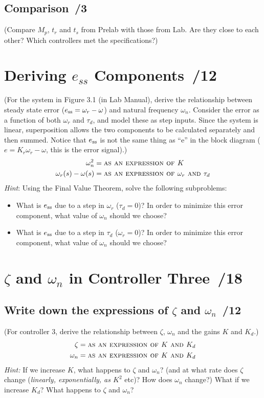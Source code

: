 \documentclass{article}
\newcommand{\score}{\hfill \underline{\hspace{0.65cm}}\,/} %
\begin{document}
\subsection{Comparison \score 3}
(Compare $M_p$, $t_r$ and $t_s$ from Prelab with those from Lab. Are they close to each other? Which controllers met the specifications?)

\section{{\sc Deriving $e_{ss}$ Components} \score 12}
(For the system in Figure 3.1 (in Lab Manual), derive the relationship between steady state error ($e_{\rm ss}= \omega_r - \omega$) and natural frequency $\omega_n$. Consider the error as a function of both $\omega_r$ and $\tau_d$, and model these as step inputs. Since the system is linear, superposition allows the two components to be calculated separately and then summed. Notice that $e_{\rm ss}$ is not the same thing as ``e'' in the block diagram ($e= K_r\omega_r - \omega$, this is the error signal).)
\begin{align*}
  \omega_n^2 & = \mbox{\sc as an expression of $K$} \\
  \omega_r(s) - \omega(s) & = \mbox{\sc as an expression of $\omega_r$ and $\tau_d$}
\end{align*}
\emph{Hint}: Using the Final Value Theorem, solve the following subproblems:
\begin{itemize}
\item What is $e_{\rm ss}$ due to a step in $\omega_r$ ($\tau_d = 0$)? In order to minimize this error component, what value of $\omega_n$ should we choose?
\item What is $e_{\rm ss}$ due to a step in $\tau_d$ ($\omega_r = 0$)? In order to minimize this error component, what value of $\omega_n$ should we choose?
\end{itemize}

\section{{\sc $\zeta$ and $\omega_n$ in Controller Three} \score 18}
\subsection{Write down the expressions of $\zeta$ and $\omega_n$ \score 12}
(For controller 3, derive the relationship between $\zeta$, $\omega_n$ and the gains $K$ and $K_d$.)
\begin{align*}
\zeta & = \mbox{\sc as an expression of $K$ and $K_d$} \\  
\omega_n & = \mbox{\sc as an expression of $K$ and $K_d$}  
\end{align*}
\emph{Hint:} If we increase $K$, what happens to $\zeta$ and $\omega_n$? (and at what rate does $\zeta$ change (\emph{linearly, exponentially, as $K^2$} etc)? How does $\omega_n$ change?) What if we increase $K_d$? What happens to $\zeta$ and $\omega_n$?
\end{document}

